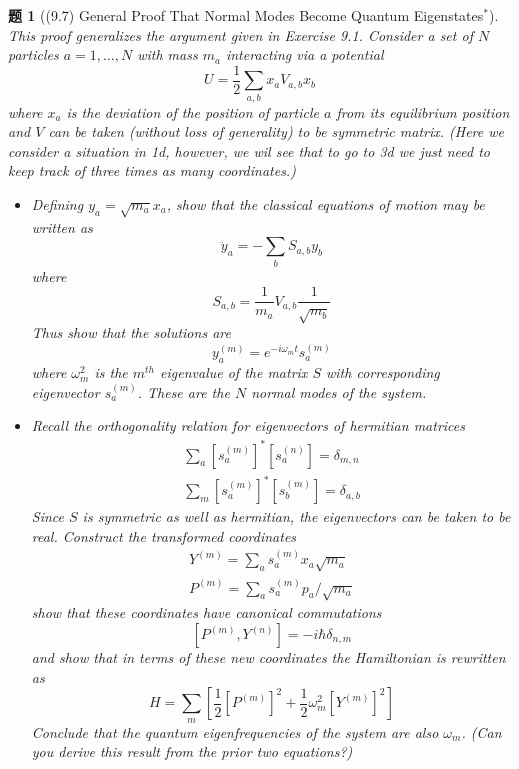 \documentclass[UTF8,10pt,a4paper]{article}
\theoremstyle{Problem}
\newtheorem{prob}{题}
\theoremstyle{Solution}
\begin{document}
\begin{prob}[(9.7) General Proof That Normal Modes Become Quantum Eigenstates$^*$]
    This proof generalizes the argument given in Exercise 9.1. Consider a set of $N$ particles $a=1,\dots,N$ with mass $m_a$ interacting via a potential
    \[
        U=\frac{1}{2}\sum_{a,b}x_aV_{a,b}x_b
    \]
    where $x_a$ is the deviation of the position of particle $a$ from its equilibrium position and $V$ can be taken (without loss of generality) to be symmetric matrix. (Here we consider a situation in 1d, however, we wil see that to go to 3d we just need to keep track of three times as many coordinates.)
    \begin{itemize}
        \item[i.] Defining $y_a=\sqrt{m_a}x_a$, show that the classical equations of motion may be written as
        \[
            \ddot{y}_a=-\sum_bS_{a,b}y_b
        \]
        where
        \[
            S_{a,b}=\frac{1}{m_a}V_{a,b}\frac{1}{\sqrt{m_b}}
        \]
        Thus show that the solutions are
        \[
            y_a^{(m)}=e^{-i\omega_mt}s_a^{(m)}
        \]
        where $\omega_m^2$ is the $m^{th}$ eigenvalue of the matrix $S$ with corresponding eigenvector $s_a^{(m)}$. These are the $N$ normal modes of the system.
        \item[ii.] Recall the orthogonality relation for eigenvectors of hermitian matrices
        \begin{gather}
            \sum_a[s_a^{(m)}]^*[s_a^{(n)}]=\delta_{m,n}\tag{9.8}\\
            \sum_m[s_a^{(m)}]^*[s_b^{(m)}]=\delta_{a,b}\tag{9.9}
        \end{gather}
        Since $S$ is symmetric as well as hermitian, the eigenvectors can be taken to be real. Construct the transformed coordinates
        \begin{gather}
            Y^{(m)}=\sum_as_a^{(m)}x_a\sqrt{m_a}\tag{9.10}\\
            P^{(m)}=\sum_as_a^{(m)}p_a/\sqrt{m_a}\tag{9.11}
        \end{gather}
        show that these coordinates have canonical commutations
        \[
            [P^{(m)},Y^{(n)}]=-i\hbar\delta_{n,m}\tag{9.12}
        \]
        and show that in terms of these new coordinates the Hamiltonian is rewritten as
        \[
            H=\sum_m\left[\frac{1}{2}[P^{(m)}]^2+\frac{1}{2}\omega_m^2[Y^{(m)}]^2\right]
        \]
        Conclude that the quantum eigenfrequencies of the system are also $\omega_m$. (Can you derive this result from the prior two equations?)
    \end{itemize}
\end{prob}
\end{document}
